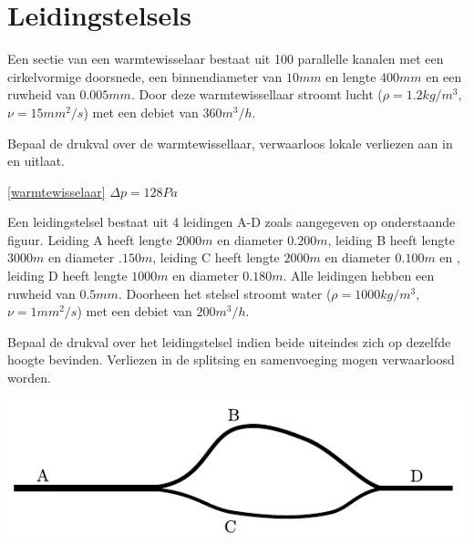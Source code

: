 \chapter{Leidingstelsels}
\label{sec:Leidingstelsels}
\begin{toepassing}[*]
	\label{warmtewisselaar}
Een sectie van een warmtewisselaar bestaat uit 100 parallelle kanalen met een cirkelvormige doorsnede, een binnendiameter van $10\unit{mm}$ en lengte $400\unit{mm}$ en een ruwheid van $0.005\unit{mm}$. Door deze warmtewissellaar stroomt lucht ($\rho=1.2\unit{kg/m^3}$, $\nu=15\unit{mm^2/s}$) met een debiet van $360\unit{m^3/h}$.
		
Bepaal de drukval over de warmtewissellaar, verwaarloos lokale verliezen aan in en uitlaat.	
\end{toepassing}
\begin{antwoord}{\ref{warmtewisselaar}}
	$\Delta p = 128\unit{Pa}$
\end{antwoord}
\begin{toepassing}[*]
	\label{serie parallel}
Een leidingstelsel bestaat uit 4 leidingen A-D zoals aangegeven op onderstaande figuur. Leiding A heeft lengte $2000\unit{m}$ en diameter $0.200\unit{m}$, leiding B heeft lengte $3000\unit{m}$ en diameter $.150\unit{m}$, leiding C heeft lengte $2000\unit{m}$ en diameter $0.100\unit{m}$ en , leiding D heeft lengte $1000\unit{m}$ en diameter $0.180\unit{m}$. Alle leidingen hebben een ruwheid van $0.5\unit{mm}$. Doorheen het stelsel stroomt water ($\rho=1000\unit{kg/m^3}$, $\nu=1\unit{mm^2/s}$) met een debiet van $200\unit{m^3/h}$.

Bepaal de drukval over het leidingstelsel indien beide uiteindes zich op dezelfde hoogte bevinden. Verliezen in de splitsing en samenvoeging mogen verwaarloosd worden.

	\centering
	\includegraphics{fig/leidingstelsels/serie_parallel}
\end{toepassing}
